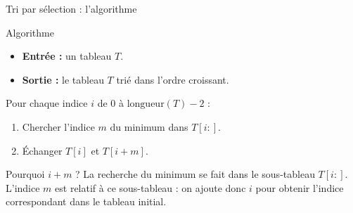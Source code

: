\documentclass[10pt]{beamer}
\begin{document}
\begin{frame}{Tri par sélection : l'algorithme}

\begin{block}{Algorithme}
\begin{itemize}
    \item \textbf{Entrée :} un tableau $T$.
    \item \textbf{Sortie :} le tableau $T$ trié dans l'ordre croissant.
\end{itemize}

\medskip

Pour chaque indice $i$ de $0$ à $\text{longueur}(T)-2$ :

\begin{enumerate}
    \item Chercher l'indice $m$ du minimum dans $T[i:]$.
    \item Échanger $T[i]$ et $T[i+m]$.
\end{enumerate}
\end{block}

\pause

\begin{alertblock}{Pourquoi $i+m$ ?}
La recherche du minimum se fait dans le sous-tableau $T[i:]$.
L'indice $m$ est relatif à ce sous-tableau : on ajoute donc $i$
pour obtenir l'indice correspondant dans le tableau initial.
\end{alertblock}

\end{frame}
\end{document}
